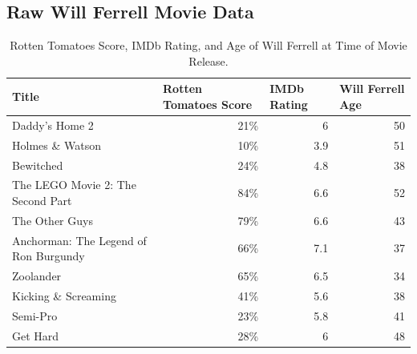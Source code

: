 \documentclass[11pt]{article}
\begin{document}
\subsection{\centering Raw Will Ferrell Movie Data}
    \begin{table}[H]
        \centering
        \scriptsize
        \caption{Rotten Tomatoes Score, IMDb Rating, and Age of Will Ferrell at Time of Movie Release.}
        \begin{tabular}{|l|r|r|r|}
        \hline
        \textbf{Title}                         & \multicolumn{1}{l|}{\textbf{Rotten Tomatoes Score}} & \multicolumn{1}{l|}{\textbf{IMDb Rating}} & \multicolumn{1}{l|}{\textbf{Will Ferrell Age}} \\ \hline%
        Daddy's Home 2                        & 21\%                                       & 6                                & 50                                    \\ \hline%
        Holmes \& Watson                      & 10\%                                       & 3.9                              & 51                                    \\ \hline%
        Bewitched                             & 24\%                                       & 4.8                              & 38                                    \\ \hline%
        The LEGO Movie 2: The Second Part     & 84\%                                       & 6.6                              & 52                                    \\ \hline%
        The Other Guys                        & 79\%                                       & 6.6                              & 43                                    \\ \hline%
        Anchorman: The Legend of Ron Burgundy & 66\%                                       & 7.1                              & 37                                    \\ \hline%
        Zoolander                             & 65\%                                       & 6.5                              & 34                                    \\ \hline%
        Kicking \& Screaming                  & 41\%                                       & 5.6                              & 38                                    \\ \hline%
        Semi-Pro                              & 23\%                                       & 5.8                              & 41                                    \\ \hline%
        Get Hard                              & 28\%                                       & 6                                & 48                                    \\ \hline%
        \end{tabular}
    \end{table}
\end{document}
